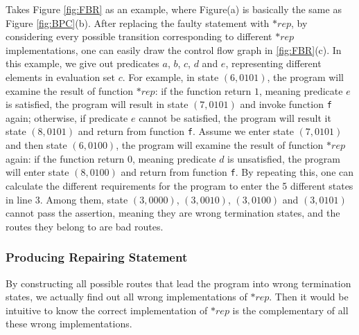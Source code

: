 Takes Figure \ref{fig:FBR} as an example, where Figure(a) is basically the same as Figure \ref{fig:BPC}(b).
After replacing the faulty statement with $*rep$, by considering every possible transition corresponding to different $*rep$ implementations,
one can easily draw the control flow graph in \ref{fig:FBR}(c). In this example, we give out predicates $a$, $b$, $c$, $d$ and $e$, representing different elements in evaluation set $c$.
For example, in state $(6,0101)$, the program will examine the result of function $*rep$: if the function return $1$, meaning predicate $e$ is satisfied, the program will result in state $(7,0101)$ and invoke function \lstinline|f| again; otherwise, if predicate $e$ cannot be satisfied, the program will result it state $(8,0101)$ and return from function \lstinline|f|.
Assume we enter state $(7,0101)$ and then state $(6,0100)$, the program will examine the result of function $*rep$ again: if the function return $0$, meaning predicate $d$ is unsatisfied, the program will enter state $(8,0100)$ and return from function \lstinline|f|.
By repeating this, one can calculate the different requirements for the program to enter the 5 different states in line $3$. Among them, state $(3,0000)$, $(3,0010)$, $(3,0100)$ and $(3,0101)$ cannot pass the assertion, meaning they are wrong termination states, and the routes they belong to are bad routes.

\subsubsection{Producing Repairing Statement}
\label{section:ProducingRepairingStatement}
By constructing all possible routes that lead the program into wrong termination states, we actually find out all wrong implementations of $*rep$.
Then it would be intuitive to know the correct implementation of $*rep$ is the complementary of all these wrong implementations.

